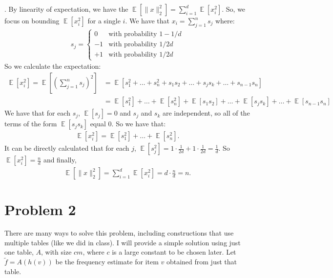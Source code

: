\documentclass[11pt]{article}
\DeclareMathOperator*{\E}{\mathbb{E}}
\begin{document}
	\medskip{}. \hspace{1em}
	By linearity of expectation, we have the $\E[\|x\|_2^2]  = \sum_{i=1}^d \E[x_i^2]$. So,  we focus on bounding $\E[x_i^2]$ for a single $i$. We have that $x_i = \sum_{j=1}^n s_j$ where:
	\begin{align*}
		s_j = \begin{cases}
			0 & \text{with probability } 1 - 1/d \\
			-1 & \text{with probability } 1/2d \\
			+1 & \text{with probability } 1/2d 
		\end{cases}
	\end{align*}
	So we calculate the expectation:
	\begin{align*}
		\E[x_i^2] = \E\left[\left(\sum_{j=1}^n s_j\right)^2\right] &= \E\left[s_1^2 + \ldots + s_n^2 + s_1s_2 + \ldots + s_js_k + \ldots + s_{n-1} s_n\right] \\
		&= \E[s_1^2] + \ldots + \E[s_n^2] + \E[s_1s_2] + \ldots + \E[s_js_k] + \ldots + \E[s_{n-1}s_n]
	\end{align*}
We have that for each $s_j$, $\E[s_j] = 0$ and $s_j$ and $s_k$ are independent, so all of the terms of the form $\E[s_js_k]$ equal $0$. So we have that:
\begin{align*}
	\E[x_i^2] = \E[s_1^2] + \ldots + \E[s_n^2].
\end{align*}
It can be directly calculated that for each $j$, $\E[s_j^2] =  1\cdot \frac{1}{2d} + 1\cdot \frac{1}{2d} = \frac{1}{d}$. So $\E[x_i^2] = \frac{n}{d}$ and finally,
\begin{align*}
	\E[\|x\|_2^2]  = \sum_{i=1}^d \E[x_i^2] = d\cdot \frac{n}{d} = n.
\end{align*}
	

\section*{Problem 2}
There are many ways to solve this problem, including constructions that use multiple tables (like we did in class). I will provide a simple solution using just one table, $A$, with size $cm$, where $c$ is a large constant to be chosen later. Let $\tilde{f} = A(h(v))$ be the frequency estimate for item $v$ obtained from just that table.
\end{document}
